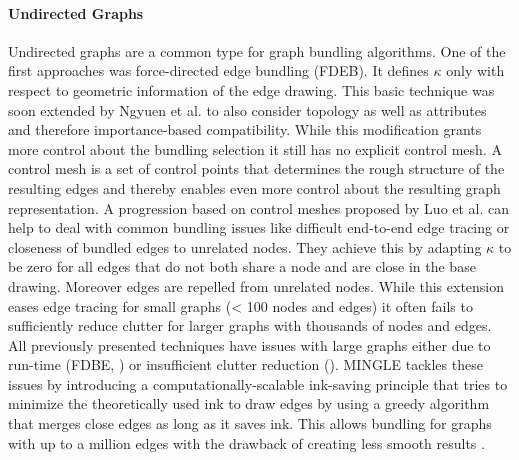 \paragraph*{Undirected Graphs} Undirected graphs are a common type for graph bundling algorithms. One of the first approaches was force-directed edge bundling (FDEB). It defines $\kappa$ only with respect to geometric information of the edge drawing. This basic technique was soon extended by Ngyuen et al. \cite{Nguyen2011} to also consider topology as well as attributes and therefore importance-based compatibility. While this modification grants more control about the bundling selection it still has no explicit control mesh. A control mesh is a set of control points that determines the rough structure of the resulting edges and thereby enables even more control about the resulting graph representation. A progression based on control meshes proposed by Luo et al. \cite{Luo2012} can help to deal with common bundling issues like difficult end-to-end edge tracing or closeness of bundled edges to unrelated nodes. They achieve this by adapting $\kappa$ to be zero for all edges that do not both share a node and are close in the base drawing. Moreover edges are repelled from unrelated nodes. While this extension eases edge tracing for small graphs (< 100 nodes and edges) it often fails to sufficiently reduce clutter for larger graphs with thousands of nodes and edges.\\
All previously presented techniques have issues with large graphs either due to run-time (FDBE, \cite{Nguyen2011}) or insufficient clutter reduction (\cite{Luo2012}). MINGLE \cite{Gansner2011} tackles these issues by introducing a computationally-scalable ink-saving principle that tries to minimize the theoretically used ink to draw edges by using a greedy algorithm that merges close edges as long as it saves ink. This allows bundling for graphs with up to a million edges with the drawback of creating less smooth results \cite{Lhuillier2017}. 

